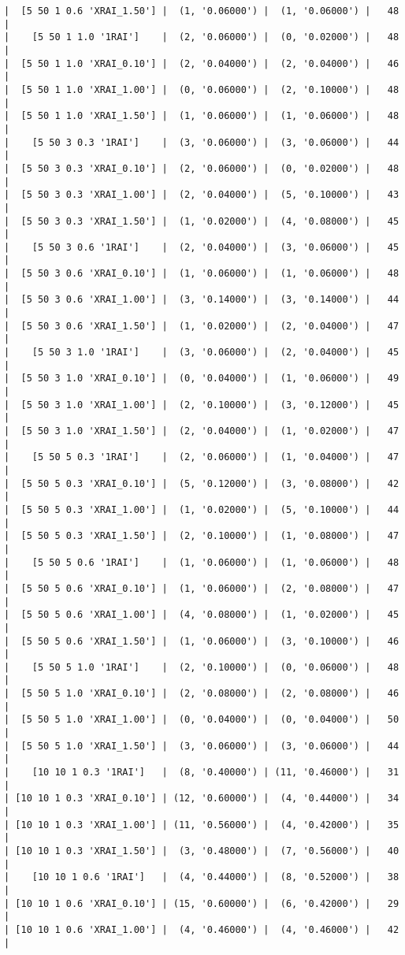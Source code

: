 \documentclass{article}
\begin{document}
\begin{verbatim}
|  [5 50 1 0.6 'XRAI_1.50'] |  (1, '0.06000') |  (1, '0.06000') |   48  |
|    [5 50 1 1.0 '1RAI']    |  (2, '0.06000') |  (0, '0.02000') |   48  |
|  [5 50 1 1.0 'XRAI_0.10'] |  (2, '0.04000') |  (2, '0.04000') |   46  |
|  [5 50 1 1.0 'XRAI_1.00'] |  (0, '0.06000') |  (2, '0.10000') |   48  |
|  [5 50 1 1.0 'XRAI_1.50'] |  (1, '0.06000') |  (1, '0.06000') |   48  |
|    [5 50 3 0.3 '1RAI']    |  (3, '0.06000') |  (3, '0.06000') |   44  |
|  [5 50 3 0.3 'XRAI_0.10'] |  (2, '0.06000') |  (0, '0.02000') |   48  |
|  [5 50 3 0.3 'XRAI_1.00'] |  (2, '0.04000') |  (5, '0.10000') |   43  |
|  [5 50 3 0.3 'XRAI_1.50'] |  (1, '0.02000') |  (4, '0.08000') |   45  |
|    [5 50 3 0.6 '1RAI']    |  (2, '0.04000') |  (3, '0.06000') |   45  |
|  [5 50 3 0.6 'XRAI_0.10'] |  (1, '0.06000') |  (1, '0.06000') |   48  |
|  [5 50 3 0.6 'XRAI_1.00'] |  (3, '0.14000') |  (3, '0.14000') |   44  |
|  [5 50 3 0.6 'XRAI_1.50'] |  (1, '0.02000') |  (2, '0.04000') |   47  |
|    [5 50 3 1.0 '1RAI']    |  (3, '0.06000') |  (2, '0.04000') |   45  |
|  [5 50 3 1.0 'XRAI_0.10'] |  (0, '0.04000') |  (1, '0.06000') |   49  |
|  [5 50 3 1.0 'XRAI_1.00'] |  (2, '0.10000') |  (3, '0.12000') |   45  |
|  [5 50 3 1.0 'XRAI_1.50'] |  (2, '0.04000') |  (1, '0.02000') |   47  |
|    [5 50 5 0.3 '1RAI']    |  (2, '0.06000') |  (1, '0.04000') |   47  |
|  [5 50 5 0.3 'XRAI_0.10'] |  (5, '0.12000') |  (3, '0.08000') |   42  |
|  [5 50 5 0.3 'XRAI_1.00'] |  (1, '0.02000') |  (5, '0.10000') |   44  |
|  [5 50 5 0.3 'XRAI_1.50'] |  (2, '0.10000') |  (1, '0.08000') |   47  |
|    [5 50 5 0.6 '1RAI']    |  (1, '0.06000') |  (1, '0.06000') |   48  |
|  [5 50 5 0.6 'XRAI_0.10'] |  (1, '0.06000') |  (2, '0.08000') |   47  |
|  [5 50 5 0.6 'XRAI_1.00'] |  (4, '0.08000') |  (1, '0.02000') |   45  |
|  [5 50 5 0.6 'XRAI_1.50'] |  (1, '0.06000') |  (3, '0.10000') |   46  |
|    [5 50 5 1.0 '1RAI']    |  (2, '0.10000') |  (0, '0.06000') |   48  |
|  [5 50 5 1.0 'XRAI_0.10'] |  (2, '0.08000') |  (2, '0.08000') |   46  |
|  [5 50 5 1.0 'XRAI_1.00'] |  (0, '0.04000') |  (0, '0.04000') |   50  |
|  [5 50 5 1.0 'XRAI_1.50'] |  (3, '0.06000') |  (3, '0.06000') |   44  |
|    [10 10 1 0.3 '1RAI']   |  (8, '0.40000') | (11, '0.46000') |   31  |
| [10 10 1 0.3 'XRAI_0.10'] | (12, '0.60000') |  (4, '0.44000') |   34  |
| [10 10 1 0.3 'XRAI_1.00'] | (11, '0.56000') |  (4, '0.42000') |   35  |
| [10 10 1 0.3 'XRAI_1.50'] |  (3, '0.48000') |  (7, '0.56000') |   40  |
|    [10 10 1 0.6 '1RAI']   |  (4, '0.44000') |  (8, '0.52000') |   38  |
| [10 10 1 0.6 'XRAI_0.10'] | (15, '0.60000') |  (6, '0.42000') |   29  |
| [10 10 1 0.6 'XRAI_1.00'] |  (4, '0.46000') |  (4, '0.46000') |   42  |

\end{verbatim}
\end{document}
